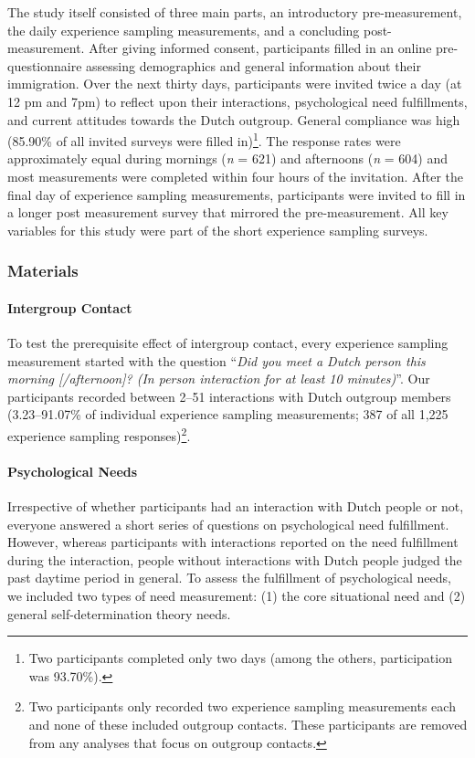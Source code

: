 The study itself consisted of three main parts, an introductory
pre-measurement, the daily experience sampling measurements, and a
concluding post-measurement. After giving informed consent, participants
filled in an online pre-questionnaire assessing demographics and general
information about their immigration. Over the next thirty days,
participants were invited twice a day (at 12 pm and 7pm) to reflect upon
their interactions, psychological need fulfillments, and current
attitudes towards the Dutch outgroup. General compliance was high
(85.90\% of all invited surveys were filled
in)\footnote{Two participants completed only two days (among the others, participation was 93.70\%).}.
The response rates were approximately equal during mornings (\textit{n}
= 621) and afternoons (\textit{n} = 604) and most measurements were
completed within four hours of the invitation. After the final day of
experience sampling measurements, participants were invited to fill in a
longer post measurement survey that mirrored the pre-measurement. All
key variables for this study were part of the short experience sampling
surveys.

\subsubsection{Materials}

\paragraph{Intergroup Contact}

To test the prerequisite effect of intergroup contact, every experience
sampling measurement started with the question
``\textit{Did you meet a Dutch person this morning [/afternoon]? (In person interaction for at least 10 minutes)}''.
Our participants recorded between 2--51 interactions with Dutch outgroup
members (3.23--91.07\% of individual experience sampling measurements;
387 of all 1,225 experience sampling
responses)\footnote{Two participants only recorded two experience sampling measurements each and none of these included outgroup contacts. These participants are removed from any analyses that focus on outgroup contacts.}.

\paragraph{Psychological Needs}

Irrespective of whether participants had an interaction with Dutch
people or not, everyone answered a short series of questions on
psychological need fulfillment. However, whereas participants with
interactions reported on the need fulfillment during the interaction,
people without interactions with Dutch people judged the past daytime
period in general. To assess the fulfillment of psychological needs, we
included two types of need measurement: (1) the core situational need
and (2) general self-determination theory needs.

